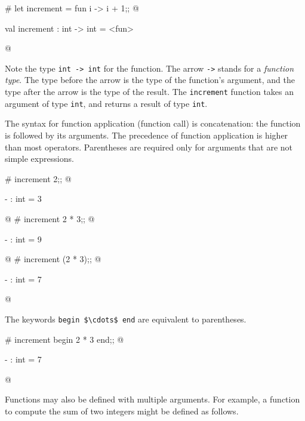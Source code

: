 \begin{ocaml}
# let increment = fun i -> i + 1;;
@
\begin{topoutput}
val increment : int -> int = <fun>
\end{topoutput}
@
\end{ocaml}
%
Note the type \hbox{\lstinline/int -> int/} for the function.  The arrow \hbox{\lstinline/->/}
stands for a \emph{function type}.  The type before the arrow is the
type of the function's argument, and the type after the arrow is the
type of the result.  The \texttt{increment} function takes an argument of
type \texttt{int}, and returns a result of type \texttt{int}.

The syntax for function application (function call) is concatenation:
the function is followed by its arguments.  The precedence of function
application is higher than most operators.  Parentheses are required
only for arguments that are not simple expressions.

\label{application}
\label{keyword:paren}
\begin{ocaml}
# increment 2;;
@
\begin{topoutput}
- : int = 3
\end{topoutput}
@
# increment 2 * 3;;
@
\begin{topoutput}
- : int = 9
\end{topoutput}
@
# increment (2 * 3);;
@
\begin{topoutput}
- : int = 7
\end{topoutput}
@
\end{ocaml}
%
\label{keyword:begin}
\label{keyword:end}
The keywords \hbox{\lstinline/begin $\cdots$ end/} are equivalent to parentheses.
%
\begin{ocaml}
# increment begin 2 * 3 end;;
@
\begin{topoutput}
- : int = 7
\end{topoutput}
@
\end{ocaml}
%
Functions may also be defined with multiple arguments.  For example,
a function to compute the sum of two integers might be defined as follows.

